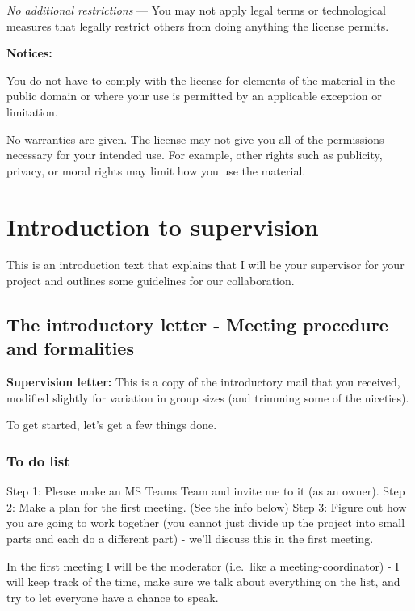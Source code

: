 \documentclass[
]{book}
\begin{document}
\emph{No additional restrictions} --- You may not apply legal terms or technological measures that legally restrict others from doing anything the license permits.

\textbf{Notices:}

You do not have to comply with the license for elements of the material in the public domain or where your use is permitted by an applicable exception or limitation.

No warranties are given. The license may not give you all of the permissions necessary for your intended use. For example, other rights such as publicity, privacy, or moral rights may limit how you use the material.

\hypertarget{introduction-to-supervision}{%
\chapter{Introduction to supervision}\label{introduction-to-supervision}}

This is an introduction text that explains that I will be your
supervisor for your project and outlines some guidelines for our
collaboration.

\hypertarget{the-introductory-letter---meeting-procedure-and-formalities}{%
\section{The introductory letter - Meeting procedure and formalities}\label{the-introductory-letter---meeting-procedure-and-formalities}}

\textbf{Supervision letter:}
This is a copy of the introductory mail that you received, modified slightly for variation in group sizes (and trimming some of the niceties).

To get started, let's get a few things done.

\hypertarget{to-do-list}{%
\subsection{To do list}\label{to-do-list}}

Step 1: Please make an MS Teams Team and invite me to it (as an owner).
Step 2: Make a plan for the first meeting. (See the info below)
Step 3: Figure out how you are going to work together (you cannot just divide up the project into small parts and each do a different part) - we'll discuss this in the first meeting.

In the first meeting I will be the moderator (i.e.~like a meeting-coordinator) - I will keep track of the time, make sure we talk about everything on the list, and try to let everyone have a chance to speak.
\end{document}
